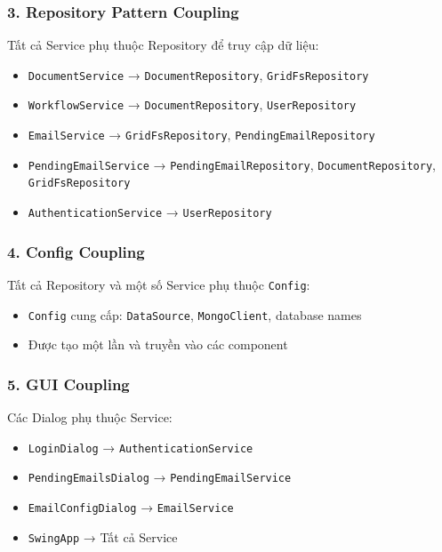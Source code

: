 \documentclass[12pt,a4paper]{article}
\begin{document}
\subsubsection{3. Repository Pattern Coupling}
Tất cả Service phụ thuộc Repository để truy cập dữ liệu:

\begin{itemize}
    \item \texttt{DocumentService} → \texttt{DocumentRepository}, \texttt{GridFsRepository}
    \item \texttt{WorkflowService} → \texttt{DocumentRepository}, \texttt{UserRepository}
    \item \texttt{EmailService} → \texttt{GridFsRepository}, \texttt{PendingEmailRepository}
    \item \texttt{PendingEmailService} → \texttt{PendingEmailRepository}, \texttt{DocumentRepository}, \texttt{GridFsRepository}
    \item \texttt{AuthenticationService} → \texttt{UserRepository}
\end{itemize}

\subsubsection{4. Config Coupling}
Tất cả Repository và một số Service phụ thuộc \texttt{Config}:

\begin{itemize}
    \item \texttt{Config} cung cấp: \texttt{DataSource}, \texttt{MongoClient}, database names
    \item Được tạo một lần và truyền vào các component
\end{itemize}

\subsubsection{5. GUI Coupling}
Các Dialog phụ thuộc Service:

\begin{itemize}
    \item \texttt{LoginDialog} → \texttt{AuthenticationService}
    \item \texttt{PendingEmailsDialog} → \texttt{PendingEmailService}
    \item \texttt{EmailConfigDialog} → \texttt{EmailService}
    \item \texttt{SwingApp} → Tất cả Service
\end{itemize}
\end{document}
